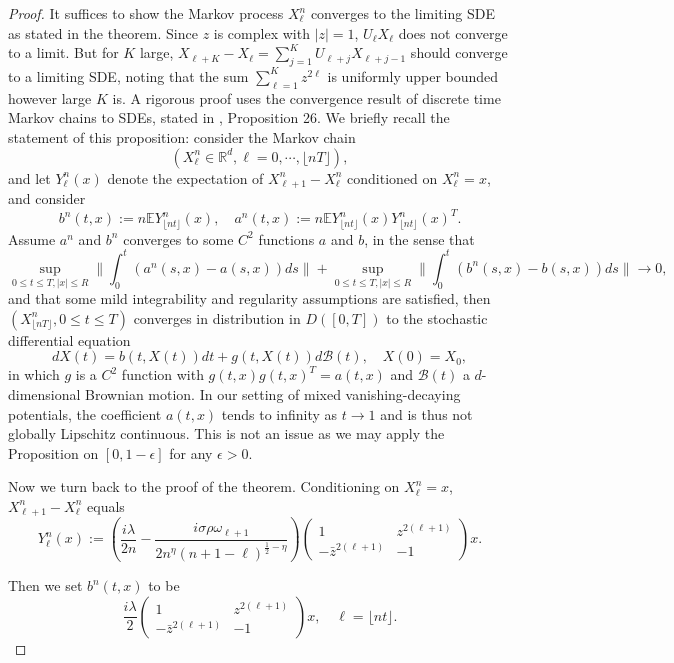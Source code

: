 \documentclass[12pt, reqno]{amsart}
\theoremstyle{definition}
\theoremstyle{remark}
\numberwithin{equation}{section}
\begin{document}
\begin{proof}
It suffices to show the Markov process $X_\ell^n$ converges to the limiting SDE as stated in the theorem. Since $z$ is complex with $|z|=1$, $U_\ell X_{\ell}$ does not converge to a limit. But for $K$ large, $X_{\ell+K}-X_\ell=\sum_{j=1}^K U_{\ell+j}X_{\ell+j-1}$ should converge to a limiting SDE, noting that the sum $\sum_{\ell=1}^K z^{2\ell}$ is uniformly upper bounded however large $K$ is. A rigorous proof uses the convergence result of discrete time Markov chains to SDEs, stated in \cite{kritchevski2011scaling}, Proposition 26. We briefly recall the statement of this proposition: consider the Markov chain 
$$(X_\ell^n\in\mathbb{R}^d,\ell=0,\cdots,\lfloor nT\rfloor),$$
and let $Y_\ell^n(x)$ denote the expectation of $X_{\ell+1}^n-X_\ell^n$ conditioned on $X_\ell^n=x$, and consider 
$$b^n(t,x):=n\mathbb{E}Y^n_{\lfloor nt\rfloor}(x),\quad a^n(t,x):=n\mathbb{E} Y^n_{\lfloor nt\rfloor}(x)  Y^n_{\lfloor nt\rfloor}(x)^T.$$
Assume $a^n$ and $b^n$ converges to some $C^2$ functions $a$ and $b$, in the sense that
\begin{equation}\label{convergencecondition}
    \sup_{0\leq t\leq T,|x|\leq R}\|\int_0^t (a^n(s,x)-a(s,x))ds\|+\sup_{0\leq t\leq T,|x|\leq R}\|\int_0^t (b^n(s,x)-b(s,x))ds\|\to 0,
\end{equation}
and that some mild integrability and regularity assumptions are satisfied, then $(X_{\lfloor nT\rfloor}^n,0\leq t\leq T)$ converges in distribution in $D([0,T])$ to the stochastic differential equation
\begin{equation}
    dX(t)=b(t,X(t))dt+g(t,X(t))d\mathcal{B}(t),\quad X(0)=X_0,
\end{equation}
in which $g$ is a $C^2$ function with $g(t,x)g(t,x)^T=a(t,x)$ and $\mathcal{B}(t)$ a $d$-dimensional Brownian motion. In our setting of mixed vanishing-decaying potentials, the coefficient $a(t,x)$ tends to infinity as $t\to 1$ and is thus not globally Lipschitz continuous. This is not an issue as we may apply the Proposition on $[0,1-\epsilon]$ for any $\epsilon>0$.

Now we turn back to the proof of the theorem. Conditioning on $X_\ell^n=x$, $X_{\ell+1}^n-X_\ell^n$ equals
$$Y_\ell^n(x):=\left(\frac{i\lambda}{2n}-\frac{i\sigma\rho \omega_{\ell+1}}{2n^\eta(n+1-\ell)^{\frac{1}{2}-\eta}}\right) \begin{pmatrix} 1&z^{2(\ell+1)}\\-\bar{z}^{2(\ell+1)} & -1\end{pmatrix}x.$$

Then we set $b^n(t,x)$ to be
$$\frac{i\lambda}{2}\begin{pmatrix}1&z^{2(\ell+1)}\\-\bar{z}^{2(\ell+1)}&-1\end{pmatrix}x,\quad  \ell=\lfloor nt\rfloor.$$


\end{proof}
\end{document}

